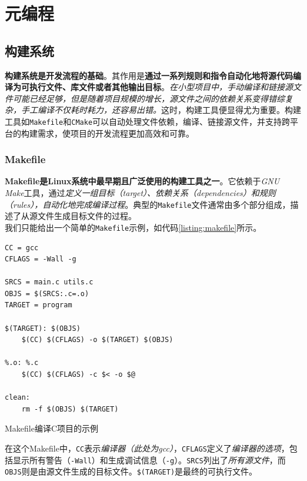 \chapter{元编程}
\label{cp:meta}

\section{构建系统}

\textbf{构建系统是开发流程的基础}。其作用是\textbf{通过一系列规则和指令自动化地将源代码编译为可执行文件、库文件或者其他输出目标}。\textit{在小型项目中，手动编译和链接源文件可能已经足够，但是随着项目规模的增长，源文件之间的依赖关系变得错综复杂，手工编译不仅耗时耗力，还容易出错。}这时，构建工具便显得尤为重要。构建工具如\texttt{Makefile}和\texttt{CMake}可以自动处理文件依赖，编译、链接源文件，并支持跨平台的构建需求，使项目的开发流程更加高效和可靠。

\subsection{Makefile}

\textbf{Makefile是Linux系统中最早期且广泛使用的构建工具之一}。它依赖于\textit{GNU Make}工具，通过\textit{定义一组目标（target）、依赖关系（dependencies）和规则（rules），自动化地完成编译过程}。典型的\texttt{Makefile}文件通常由多个部分组成，描述了从源文件生成目标文件的过程。\\

我们只能给出一个简单的\texttt{Makefile}示例，如代码\ref{listing:makefile}所示。

\begin{longlisting}
    \begin{verbatim}
CC = gcc
CFLAGS = -Wall -g

SRCS = main.c utils.c
OBJS = $(SRCS:.c=.o)
TARGET = program

$(TARGET): $(OBJS)
    $(CC) $(CFLAGS) -o $(TARGET) $(OBJS)

%.o: %.c
    $(CC) $(CFLAGS) -c $< -o $@

clean:
    rm -f $(OBJS) $(TARGET)
    \end{verbatim}
    \caption{Makefile编译C项目的示例}
    \label{listing:makefile}
\end{longlisting}

在这个Makefile中，\texttt{CC}表示\textit{编译器（此处为gcc）}，\texttt{CFLAGS}定义了\textit{编译器的选项}，包括显示所有警告（\texttt{-Wall}）和生成调试信息（\texttt{-g}）。\texttt{SRCS}列出了\textit{所有源文件}，而\texttt{OBJS}则是由源文件生成的目标文件。\texttt{\$(TARGET)}是最终的可执行文件。\\

